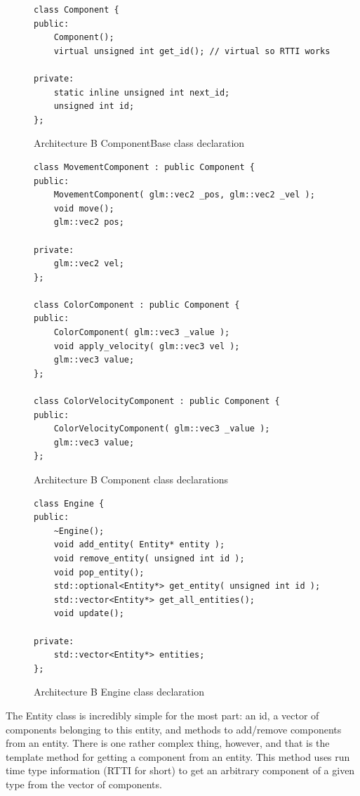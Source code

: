 \documentclass{article}
\begin{document}
\begin{figure}
\centering
\begin{BVerbatim}
class Component {
public:
    Component();
    virtual unsigned int get_id(); // virtual so RTTI works

private:
    static inline unsigned int next_id;
    unsigned int id;
};
\end{BVerbatim}
\caption{Architecture B ComponentBase class declaration}
\label{arch_b_component_base_header}
\end{figure}

\begin{figure}
\centering
\begin{BVerbatim}
class MovementComponent : public Component {
public:
    MovementComponent( glm::vec2 _pos, glm::vec2 _vel );
    void move();
    glm::vec2 pos;

private:
    glm::vec2 vel;
};

class ColorComponent : public Component {
public:
    ColorComponent( glm::vec3 _value );
    void apply_velocity( glm::vec3 vel );
    glm::vec3 value;
};

class ColorVelocityComponent : public Component {
public:
    ColorVelocityComponent( glm::vec3 _value );
    glm::vec3 value;
};
\end{BVerbatim}
\caption{Architecture B Component class declarations}
\label{arch_b_components_header}
\end{figure}

\begin{figure}
\centering
\begin{BVerbatim}
class Engine {
public:
    ~Engine();
    void add_entity( Entity* entity );
    void remove_entity( unsigned int id );
    void pop_entity();
    std::optional<Entity*> get_entity( unsigned int id );
    std::vector<Entity*> get_all_entities();
    void update();

private:
    std::vector<Entity*> entities;
};
\end{BVerbatim}
\caption{Architecture B Engine class declaration}
\label{arch_b_engine_header}
\end{figure}

The Entity class is incredibly simple for the most part: an id, a vector of
components belonging to this entity, and methods to add/remove components from
an entity. There is one rather complex thing, however, and that is the template
method for getting a component from an entity. This method uses run time type
information (RTTI for short) to get an arbitrary component of a given type from
the vector of components.
\end{document}
